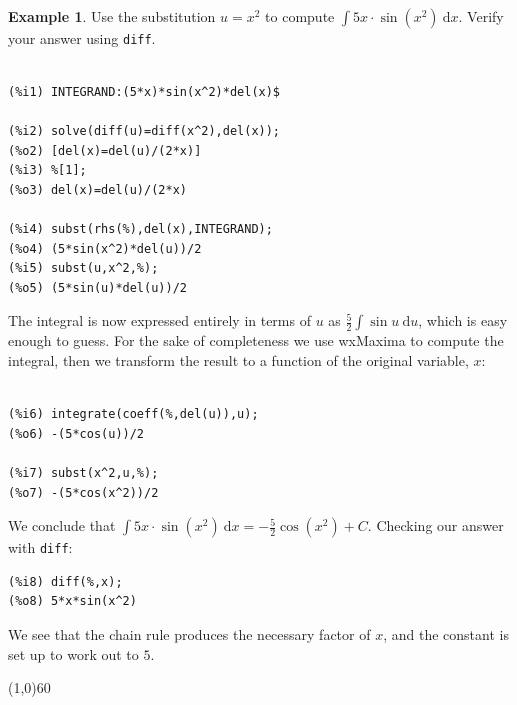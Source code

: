 \documentclass[10.5pt,twoside]{report}
\theoremstyle{definition}
\newtheorem{exmp}{Example}[section]
\begin{document}
${}$\\

\begin{exmp} Use the substitution $u=x^2$ to compute $\displaystyle \int 5x\cdot \sin{(x^2)}\ \mathrm{d}x$.  Verify your answer using \verb|diff|.\\

${}$\\


\begin{verbatim}
(%i1) INTEGRAND:(5*x)*sin(x^2)*del(x)$

(%i2) solve(diff(u)=diff(x^2),del(x));
(%o2) [del(x)=del(u)/(2*x)]
(%i3) %[1];
(%o3) del(x)=del(u)/(2*x)

(%i4) subst(rhs(%),del(x),INTEGRAND);
(%o4) (5*sin(x^2)*del(u))/2
(%i5) subst(u,x^2,%);
(%o5) (5*sin(u)*del(u))/2
\end{verbatim}

The integral is now expressed entirely in terms of $u$ as $\displaystyle \frac{5}{2} \int \sin{u}\ \mathrm{d}u$, which is easy enough to guess.  For the sake of completeness we use wxMaxima to compute the integral, then we transform the result to a function of the original variable, $x$:\\
${}$\\

\begin{verbatim}
(%i6) integrate(coeff(%,del(u)),u);
(%o6) -(5*cos(u))/2

(%i7) subst(x^2,u,%);
(%o7) -(5*cos(x^2))/2
\end{verbatim}

We conclude that $\displaystyle \int 5x\cdot \sin{(x^2)}\ \mathrm{d}x=-\frac{5}{2}\cos{(x^2)}+C$.  Checking our answer with \verb|diff|:

\begin{verbatim}
(%i8) diff(%,x);
(%o8) 5*x*sin(x^2)
\end{verbatim}

We see that the chain rule produces the necessary factor of $x$, and the constant is set up to work out to $5$.

\end{exmp}

\line(1,0){60}
\linethickness{0.5mm}
\end{document}

